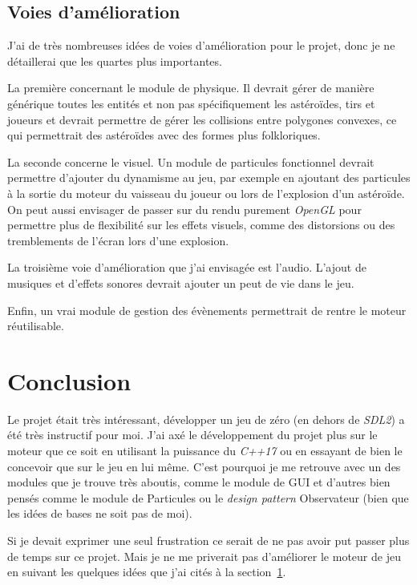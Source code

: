 \documentclass[10pt, french, a4paper]{report}
\begin{document}
\section{Voies d'amélioration}
\label{sec:voies-amelioration}

J'ai de très nombreuses idées de  voies d'amélioration pour le projet, donc je ne détaillerai que les quartes plus importantes.

La  première concernant le module de physique. Il devrait gérer de manière générique
toutes les entités et non pas spécifiquement les astéroïdes, tirs et joueurs et devrait 
permettre de gérer les collisions entre polygones convexes, ce qui permettrait des 
astéroïdes avec des formes plus folkloriques.

La seconde concerne le visuel. Un module de particules fonctionnel devrait permettre 
d'ajouter du dynamisme au jeu, par exemple en ajoutant des particules à la sortie du 
moteur du vaisseau du joueur ou lors de l'explosion d'un astéroïde. On peut aussi 
envisager de passer sur du rendu purement \textit{OpenGL} pour permettre plus de 
flexibilité sur les effets visuels, comme des distorsions ou des tremblements de 
l'écran lors d'une explosion.

La troisième voie d'amélioration que j'ai envisagée est l'audio. 
L'ajout de musiques et d'effets sonores devrait ajouter un peut de vie dans le jeu.

Enfin, un vrai module de gestion des évènements permettrait de rentre le moteur 
réutilisable.



\chapter*{Conclusion}

Le projet était très intéressant, développer un jeu de zéro (en dehors de \textit{SDL2})
a été très instructif pour moi. J'ai axé le développement du projet plus sur le 
moteur que ce soit en utilisant la puissance du \textit{C++17} ou en essayant
de bien le concevoir que sur le jeu en lui même. C'est pourquoi je me retrouve
avec un des modules que je trouve très aboutis, comme le module de GUI et d'autres 
bien pensés comme le module de Particules ou le \textit{design pattern} Observateur 
(bien que les idées de bases ne soit pas de moi).

Si je devait exprimer une seul frustration ce serait de ne pas avoir put passer plus
de temps sur ce projet. Mais je ne me priverait pas d'améliorer le moteur de jeu
en suivant les quelques idées que j'ai cités à la section~\ref{sec:voies-amelioration}.
\end{document}
